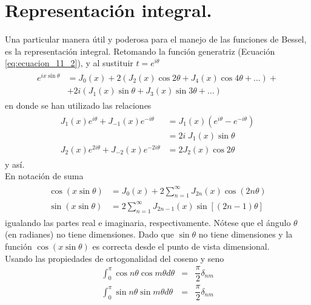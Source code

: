 \section{Representación integral.}
Una particular manera útil y poderosa para el manejo de las funciones de Bessel, es la representación integral. Retomando la función generatriz (Ecuación \ref{eq:ecuacion_11_2}), y al sustituir $t=e^{i\theta}$
\begin{eqnarray}
\begin{aligned}
e^{ix \sin \theta} &= J_{0}(x) + 2 (J_{2}(x) \cos 2 \theta + J_{4}(x) \cos 4 \theta + \ldots) + \\
&+ 2i (J_{1}(x) \sin \theta + J_{3}(x) \sin 3 \theta + \ldots)
\end{aligned}
\label{eq:ecuacion_11_23}
\end{eqnarray}
en donde se han utilizado las relaciones
\begin{eqnarray}
\begin{aligned}
J_{1}(x) e^{i \theta} + J_{-1}(x) e^{-i \theta} &= J_{1} (x) (e^{i \theta} - e^{-i \theta}) \\
&= 2 i \; J_{1}(x) \sin \theta \\
J_{2}(x) e^{2i \theta} + J_{-2}(x) e^{-2 i \theta} &= 2 J_{2} (x)\cos 2 \theta
\end{aligned}
\label{eq:ecuacion_11_24}
\end{eqnarray}
y así.
\\
En notación de suma
\begin{eqnarray}
\begin{aligned}
\cos (x \sin \theta) &= J_{0}(x) + 2 \sum_{n=1}^{\infty} J_{2n}(x) \cos (2n \theta) \\
\sin (x \sin \theta) &=  2 \sum_{n=1}^{\infty} J_{2n-1} (x) \sin [(2n - 1) \theta]
\end{aligned}
\label{eq:ecuacion_11_25}
\end{eqnarray}
igualando las partes real e imaginaria, respectivamente. Nótese que el ángulo $\theta$ (en radianes) no tiene dimensiones. Dado que $\sin \theta$ no tiene dimensiones y la función $\cos (x \sin \theta)$ es correcta desde el punto de vista dimensional.
\\
Usando las propiedades de ortogonalidad del coseno y seno
\begin{eqnarray}
\int_{0}^{\pi} \cos n \theta \cos m \theta d \theta &=& \dfrac{\pi}{2} \delta_{nm} \label{eq:ecuacion_11_26a} \\
\int_{0}^{\pi} \sin n \theta \sin m \theta d \theta &=& \dfrac{\pi}{2} \delta_{nm} \label{eq:ecuacion_11_26b}
\end{eqnarray}
